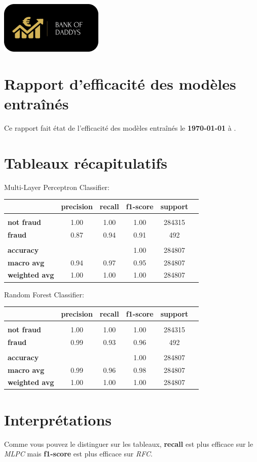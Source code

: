 \documentclass[10pt,a4paper]{article}
\begin{document}
\begin{center}
\includegraphics[scale=1]{../views/img/background_splash} 
\end{center}
\section{Rapport d'efficacité des modèles entraînés }
\flushleft
\bigbreak  
\bigbreak  
Ce rapport fait état de l'efficacité des modèles entraînés le \textbf {\today{}}  à  \textbf {\DTMcurrenttime{}}.
\bigbreak  
\section{Tableaux récapitulatifs}
\flushleft
\bigbreak  
\bigbreak  
\large  {Multi-Layer Perceptron Classifier:}
\bigbreak
\normalsize
\begin{center}
\begin{tabular}{ l | c  c  c  c  c  }
 & \textbf{precision} & \textbf {recall} & \textbf {f1-score} & \textbf {support}\\
\hline
& & & &\\
\textbf {not fraud} & 1.00 & 1.00 & 1.00 & 284315 \\
\textbf {fraud} & 0.87 & 0.94 & 0.91 & 492\\
& & & &\\
\textbf {accuracy} &  & & 1.00 & 284807\\
\textbf {macro avg} & 0.94 & 0.97 & 0.95 & 284807\\
\textbf {weighted avg} & 1.00 & 1.00 & 1.00 & 284807\\
\end{tabular}
\end{center}
\bigbreak  
\bigbreak  
\bigbreak  
\large{ Random Forest Classifier:}
\flushleft
\bigbreak  
\normalsize
\begin{center}
\begin{tabular}{ l | c  c  c  c  c  }
 & \textbf{precision} & \textbf {recall} & \textbf {f1-score} & \textbf {support}\\
\hline
& & & &\\
\textbf {not fraud} & 1.00 & 1.00 & 1.00 & 284315 \\
\textbf {fraud} & 0.99 & 0.93 & 0.96 & 492\\
& & & &\\
\textbf {accuracy} &  & & 1.00 & 284807\\
\textbf {macro avg} & 0.99 & 0.96 & 0.98 & 284807\\
\textbf {weighted avg} & 1.00 & 1.00 & 1.00 & 284807\\
\end{tabular}
\end{center}
\bigbreak  
\section{Interprétations}
\flushleft
\bigbreak  
Comme vous pouvez le distinguer sur les tableaux, \textbf{recall} est plus efficace sur le \textit{MLPC} mais \textbf{f1-score} est plus efficace sur \textit{RFC}.
\end{document}
